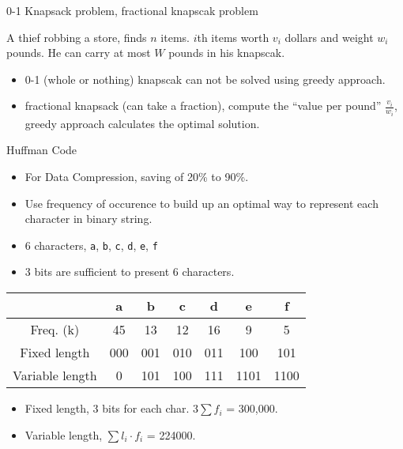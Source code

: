 \documentclass{beamer}
\begin{document}
\begin{frame}{}
\begin{center}
{\large 0-1 Knapsack problem, fractional knapscak problem}
\end{center}
A thief robbing a store, finds $n$ items.  $i$th items worth $v_i$ dollars and
 weight $w_i$ pounds.  He can carry at most $W$ pounds in his knapscak.  
\begin{itemize}
\item 0-1 (whole or nothing) knapscak can not be
 solved using greedy approach.  
\item fractional knapsack (can take a fraction), compute the ``value
 per pound'' $\frac{v_i}{w_i}$, greedy approach calculates the optimal solution.
\end{itemize}
\end{frame}

\begin{frame}{}
\begin{center}
{\Large Huffman Code}
\end{center}
\begin{itemize}
\item For Data Compression, saving of 20\% to 90\%. 
\item Use frequency of occurence to build up an optimal way to represent each
 character in binary string.  
\end{itemize}
\end{frame}

\begin{frame}{}
\begin{itemize}
\item 6 characters, {\tt a}, {\tt b}, {\tt c}, {\tt d}, {\tt e}, {\tt f} 
\item 3 bits are sufficient to present 6 characters.
\end{itemize}
\begin{tabular}{|c||c|c|c|c|c|c||}\hline
                & a  & b  & c  & d  & e & f \\ \hline
Freq. (k)       & 45 & 13 & 12 & 16 & 9 & 5  \\\hline 
Fixed length    &000 &001 & 010&011 & 100& 101 \\ \hline
Variable length &0&101&100&111&1101&1100 \\ \hline
\end{tabular}
\begin{itemize}
\item Fixed length, 3 bits for each char. $3\sum f_i$ = 300,000. 
\item Variable length, $\sum l_i\cdot f_i$ = 224000.
\end{itemize}
\end{frame}
\end{document}
